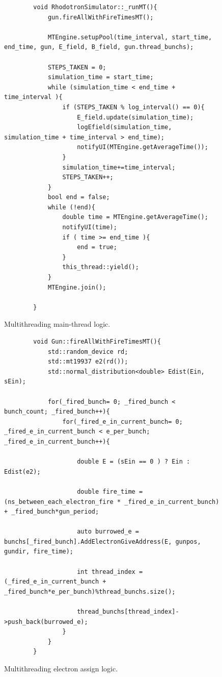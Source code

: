 \documentclass[a4paper,oneside,12pt]{report}
\numberwithin{equation}{chapter}
\begin{document}
\begin{figure}[H]
    \centering
    \captionsetup{justification=centering}
    \begin{verbatim}
        void RhodotronSimulator::_runMT(){
            gun.fireAllWithFireTimesMT();
        
            MTEngine.setupPool(time_interval, start_time, end_time, gun, E_field, B_field, gun.thread_bunchs);
        
            STEPS_TAKEN = 0;
            simulation_time = start_time;
            while (simulation_time < end_time + time_interval ){
                if (STEPS_TAKEN % log_interval() == 0){
                    E_field.update(simulation_time);
                    logEfield(simulation_time, simulation_time + time_interval > end_time);
                    notifyUI(MTEngine.getAverageTime());
                }
                simulation_time+=time_interval;
                STEPS_TAKEN++;
            }
            bool end = false;
            while (!end){
                double time = MTEngine.getAverageTime();
                notifyUI(time);
                if ( time >= end_time ){
                    end = true;
                }
                this_thread::yield();
            }
            MTEngine.join();
            
        }
    \end{verbatim}
    \caption{Multithreading main-thread logic.}
    \label{fig:_runMT}
\end{figure}

\begin{figure}[H]
    \centering
    \captionsetup{justification=centering}
    \begin{verbatim}
        void Gun::fireAllWithFireTimesMT(){
            std::random_device rd;
            std::mt19937 e2(rd());
            std::normal_distribution<double> Edist(Ein, sEin);
    
            for(_fired_bunch= 0; _fired_bunch < bunch_count; _fired_bunch++){
                for(_fired_e_in_current_bunch= 0; _fired_e_in_current_bunch < e_per_bunch; _fired_e_in_current_bunch++){
    
                    double E = (sEin == 0 ) ? Ein : Edist(e2);
    
                    double fire_time = (ns_between_each_electron_fire * _fired_e_in_current_bunch) + _fired_bunch*gun_period;
    
                    auto burrowed_e = bunchs[_fired_bunch].AddElectronGiveAddress(E, gunpos, gundir, fire_time);
    
                    int thread_index = (_fired_e_in_current_bunch + _fired_bunch*e_per_bunch)%thread_bunchs.size();
    
                    thread_bunchs[thread_index]->push_back(burrowed_e);
                }
            }
        }
    \end{verbatim}
    \caption{Multithreading electron assign logic.}
    \label{fig:fireAllWithFireTimesMT}
\end{figure}
\end{document}
